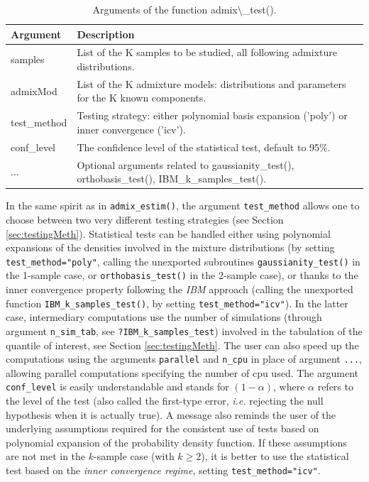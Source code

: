 \begin{table}[!h]
\centering
\caption{\label{tab:admixTestArgs-latex}Arguments of the function admix\textbackslash{}\_test().}
\centering
\fontsize{8}{10}\selectfont
\begin{tabular}[t]{ll}
\toprule
Argument & Description\\
\midrule
samples & List of the K samples to be studied, all following admixture distributions.\\
admixMod & List of the K admixture models: distributions and parameters for the K known components.\\
test\_method & Testing strategy: either polynomial basis expansion ('poly') or inner convergence ('icv').\\
conf\_level & The confidence level of the statistical test, default to 95\%.\\
... & Optional arguments related to gaussianity\_test(), orthobasis\_test(), IBM\_k\_samples\_test().\\
\bottomrule
\end{tabular}
\end{table}

In the same spirit as in \texttt{admix\_estim()}, the argument \texttt{test\_method} allows one to choose between two very different testing strategies (see Section \ref{sec:testingMeth}). Statistical tests can be handled either using polynomial expansions of the densities involved in the mixture distributions (by setting \texttt{test\_method="poly"}, calling the unexported subroutines \texttt{gaussianity\_test()} in the 1-sample case, or \texttt{orthobasis\_test()} in the 2-sample case), or thanks to the inner convergence property following the \emph{IBM} approach (calling the unexported function \texttt{IBM\_k\_samples\_test()}, by setting \texttt{test\_method="icv"}). In the latter case, intermediary computations use the number of simulations (through argument \texttt{n\_sim\_tab}, see \texttt{?IBM\_k\_samples\_test}) involved in the tabulation of the quantile of interest, see Section \ref{sec:testingMeth}. The user can also speed up the computations using the arguments \texttt{parallel} and \texttt{n\_cpu} in place of argument \texttt{...}, allowing parallel computations specifying the number of cpu used.
The argument \texttt{conf\_level} is easily understandable and stands for \((1-\alpha)\), where \(\alpha\) refers to the level of the test (also called the first-type error, \emph{i.e.} rejecting the null hypothesis when it is actually true). A message also reminds the user of the underlying assumptions required for the consistent use of tests based on polynomial expansion of the probability density function. If these assumptions are not met in the \(k\)-sample case (with \(k \geq 2\)), it is better to use the statistical test based on the \emph{inner convergence regime}, setting \texttt{test\_method="icv"}.

